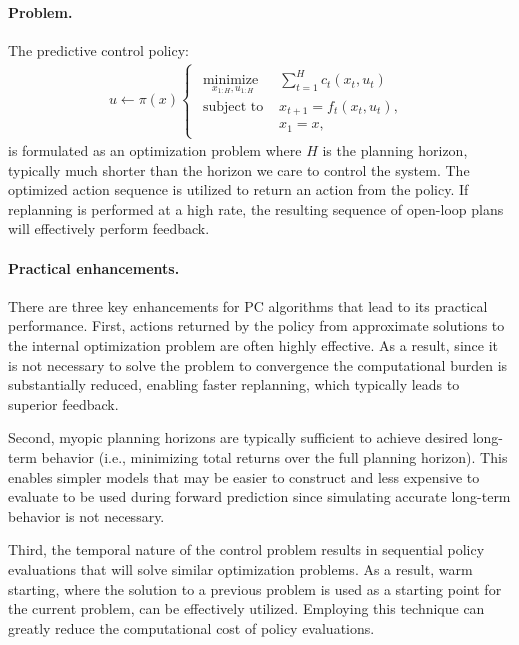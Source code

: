 \paragraph{Problem.}
The predictive control policy:
\begin{align}
	u \leftarrow \pi(x)
	\begin{cases}
		\begin{array}{ll}
			\underset{x_{1:H}, u_{1:H}}{\mbox{minimize }}  & \sum \limits_{t = 1}^{H} c_t(x_t, u_t) \\
			\mbox{subject to } & x_{t+1} = f_t(x_t, u_t), \\
			& x_1 = x,
		\end{array}
	\end{cases}
	\label{intro_mpc_policy}
\end{align}
is formulated as an optimization problem where $H$ is the planning horizon, typically much shorter than the horizon we care to control the system. The optimized action sequence is utilized to return an action from the policy. If replanning is performed at a high rate, the resulting sequence of open-loop plans will effectively perform feedback.

\paragraph{Practical enhancements.} There are three key enhancements for PC algorithms that lead to its practical performance. First, actions returned by the policy from approximate solutions to the internal optimization problem are often highly effective. As a result, since it is not necessary to solve the problem to convergence the computational burden is substantially reduced, enabling faster replanning, which typically leads to superior feedback. 

Second, myopic planning horizons are typically sufficient to achieve desired long-term behavior (i.e., minimizing total returns over the full planning horizon). This enables simpler models that may be easier to construct and less expensive to evaluate to be used during forward prediction since simulating accurate long-term behavior is not necessary. 

Third, the temporal nature of the control problem results in sequential policy evaluations that will solve similar optimization problems. As a result, warm starting, where the solution to a previous problem is used as a starting point for the current problem, can be effectively utilized. Employing this technique can greatly reduce the computational cost of policy evaluations.

